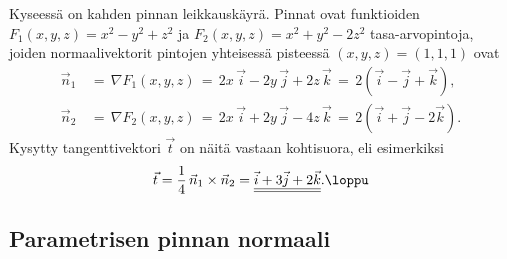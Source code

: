 \ratk Kyseessä on kahden pinnan leikkauskäyrä. Pinnat ovat funktioiden $F_1(x,y,z)=x^2-y^2+z^2$
ja $F_2(x,y,z)=x^2+y^2-2z^2$ tasa-arvopintoja, joiden normaalivektorit pintojen yhteisessä 
pisteessä $(x,y,z)=(1,1,1)$ ovat
\begin{align*}
\vec n_1\,&=\,\nabla F_1(x,y,z)\,
           =\,2x\,\vec i - 2y\,\vec j + 2z\,\vec k\,=\,2(\vec i-\vec j+\vec k), \\
\vec n_2\,&=\,\nabla F_2(x,y,z)\,
           =\,2x\,\vec i + 2y\,\vec j - 4z\,\vec k\,=\,2(\vec i+\vec j-2\vec k).
\end{align*}
Kysytty tangenttivektori $\vec t$ on näitä vastaan kohtisuora, eli esimerkiksi
\[
\vec t = \frac{1}{4}\,\vec n_1\times\vec n_2 
       = \underline{\underline{\vec i+3\vec j+2\vec k}}. \loppu
\]

\subsection{Parametrisen pinnan normaali}

